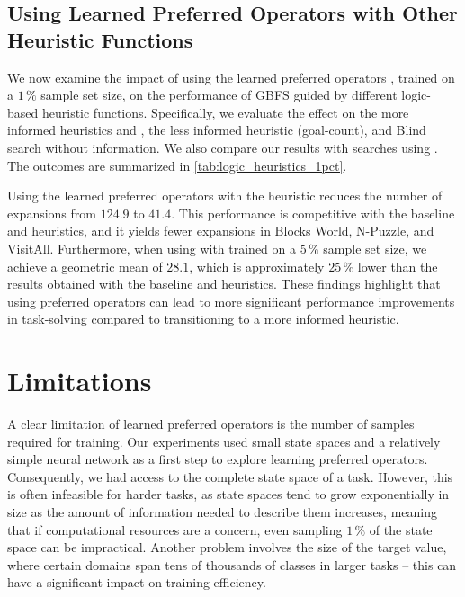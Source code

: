 \documentclass[ppgc,diss,english]{iiufrgs}
\begin{document}



\section{Using Learned Preferred Operators with Other Heuristic Functions}
\label{sec:other-heuristic-functions}
We now examine the impact of using the learned preferred operators \pog, trained on a $1\,\%$ sample set size, on the performance of GBFS guided by different logic-based heuristic functions. Specifically, we evaluate the effect on the more informed heuristics \hff and \hadd, the less informed heuristic \hgc (goal-count), and Blind search without information. We also compare our results with searches using \poff. The outcomes are summarized in \cref{tab:logic_heuristics_1pct}.



Using the learned preferred operators \pog with the \hgc heuristic reduces the number of expansions from $124.9$ to $41.4$. This performance is competitive with the baseline \hff and \hadd heuristics, and it yields fewer expansions in Blocks World, N-Puzzle, and VisitAll. Furthermore, when using \hgc with \pog trained on a $5\,\%$ sample set size, we achieve a geometric mean of $28.1$, which is approximately $25\,\%$ lower than the results obtained with the baseline \hff and \hadd heuristics. These findings highlight that using preferred operators can lead to more significant performance improvements in task-solving compared to transitioning to a more informed heuristic.


\chapter{Limitations}
\label{cha:limitations}
A clear limitation of learned preferred operators is the number of samples required for training. Our experiments used small state spaces and a relatively simple neural network as a first step to explore learning preferred operators. Consequently, we had access to the complete state space of a task. However, this is often infeasible for harder tasks, as state spaces tend to grow exponentially in size as the amount of information needed to describe them increases, meaning that if computational resources are a concern, even sampling $1\,\%$ of the state space can be impractical. Another problem involves the size of the target value, where certain domains span tens of thousands of classes in larger tasks -- this can have a significant impact on training efficiency.
\end{document}
